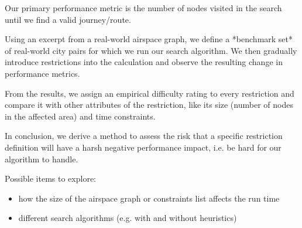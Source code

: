 \documentclass{article}
\begin{document}
Our primary performance metric is the number of nodes visited in the search until we find a valid journey/route.

Using an excerpt from a real-world airspace graph, we define a *benchmark set* of real-world city pairs for which we run our search algorithm.
We then gradually introduce restrictions into the calculation and observe the resulting change in performance metrics.

From the results, we assign an empirical difficulty rating to every restriction and compare it with other attributes of the restriction, like its size (number of nodes in the affected area) and time constraints.

In conclusion, we derive a method to assess the risk that a specific restriction definition will have a harsh negative performance impact, i.e. be hard for our algorithm to handle.



Possible items to explore:

\begin{itemize}
\item how the size of the airspace graph or constraints list affects the run time
\item different search algorithms (e.g. with and without heuristics)
\end{itemize}


\begin{thebibliography}{99} %
 
\end{thebibliography}

\end{document}

